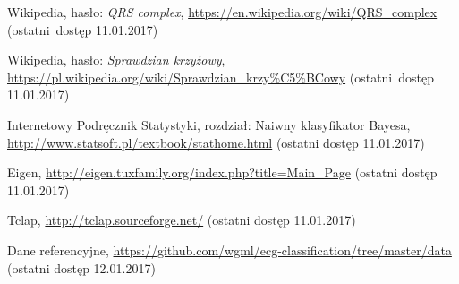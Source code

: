 \documentclass[12pt]{article}
\begin{document}
 








\begin{thebibliography}{5}
	Wikipedia, hasło: \textit{QRS complex},
	\url{https://en.wikipedia.org/wiki/QRS_complex}
	(ostatni~dostęp 11.01.2017)

	Wikipedia, hasło: \textit{Sprawdzian krzyżowy},
	\url{https://pl.wikipedia.org/wiki/Sprawdzian_krzy%C5%BCowy}
	(ostatni~dostęp 11.01.2017)
	
	Internetowy Podręcznik Statystyki, rozdział: Naiwny klasyfikator Bayesa,
	\url{http://www.statsoft.pl/textbook/stathome.html}
	(ostatni dostęp 11.01.2017)
	
	Eigen, 
	\url{http://eigen.tuxfamily.org/index.php?title=Main_Page}
	(ostatni dostęp 11.01.2017)

	Tclap, 
	\url{http://tclap.sourceforge.net/}
	(ostatni dostęp 11.01.2017)
	
	Dane referencyjne,
	\url{https://github.com/wgml/ecg-classification/tree/master/data}
	(ostatni dostęp 12.01.2017)

\end{thebibliography}
\end{document}
